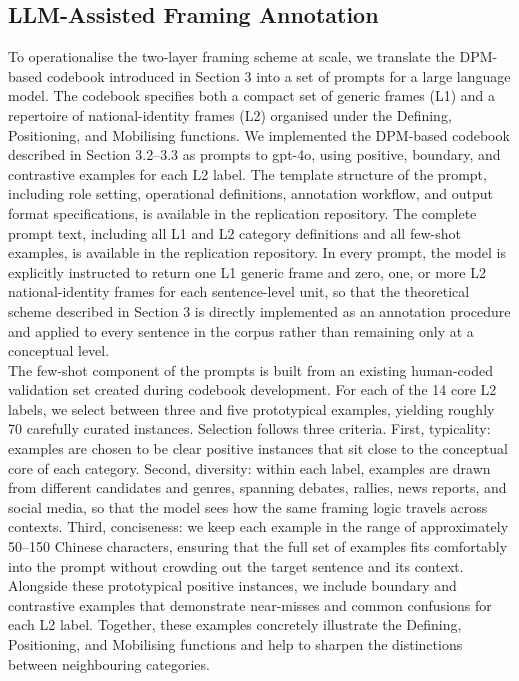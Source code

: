 \documentclass[man,12pt]{apa7}
\begin{document}
\subsection{LLM-Assisted Framing Annotation}
To operationalise the two-layer framing scheme at scale, we translate the DPM-based codebook introduced in Section 3 into a set of prompts for a large language model. 
The codebook specifies both a compact set of generic frames (L1) and a repertoire of national-identity frames (L2) organised under the Defining, Positioning, and Mobilising functions. 
We implemented the DPM-based codebook described in Section 3.2--3.3 as prompts to gpt-4o, using positive, boundary, and contrastive examples for each L2 label. 
The template structure of the prompt, including role setting, operational definitions, annotation workflow, and output format specifications, is available in the replication repository. 
The complete prompt text, including all L1 and L2 category definitions and all few-shot examples, is available in the replication repository. 
In every prompt, the model is explicitly instructed to return one L1 generic frame and zero, one, or more L2 national-identity frames for each sentence-level unit, so that the theoretical scheme described in Section 3 is directly implemented as an annotation procedure and applied to every sentence in the corpus rather than remaining only at a conceptual level.\\%
The few-shot component of the prompts is built from an existing human-coded validation set created during codebook development. 
For each of the 14 core L2 labels, we select between three and five prototypical examples, yielding roughly 70 carefully curated instances. 
Selection follows three criteria. 
First, typicality: examples are chosen to be clear positive instances that sit close to the conceptual core of each category. 
Second, diversity: within each label, examples are drawn from different candidates and genres, spanning debates, rallies, news reports, and social media, so that the model sees how the same framing logic travels across contexts. 
Third, conciseness: we keep each example in the range of approximately 50--150 Chinese characters, ensuring that the full set of examples fits comfortably into the prompt without crowding out the target sentence and its context. 
Alongside these prototypical positive instances, we include boundary and contrastive examples that demonstrate near-misses and common confusions for each L2 label. 
Together, these examples concretely illustrate the Defining, Positioning, and Mobilising functions and help to sharpen the distinctions between neighbouring categories.\\%
\end{document}
